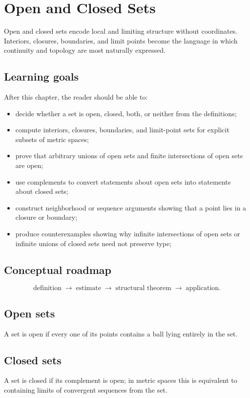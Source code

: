\chapter{Open and Closed Sets}
\label{ch:ii04}

Open and closed sets encode local and limiting structure without coordinates. Interiors, closures, boundaries, and limit points become the language in which continuity and topology are most naturally expressed.

\section*{Learning goals}
After this chapter, the reader should be able to:
\begin{itemize}
\item decide whether a set is open, closed, both, or neither from the definitions;
\item compute interiors, closures, boundaries, and limit-point sets for explicit subsets of metric spaces;
\item prove that arbitrary unions of open sets and finite intersections of open sets are open;
\item use complements to convert statements about open sets into statements about closed sets;
\item construct neighborhood or sequence arguments showing that a point lies in a closure or boundary;
\item produce counterexamples showing why infinite intersections of open sets or infinite unions of closed sets need not preserve type;
\end{itemize}
\section*{Conceptual roadmap}
\[
\boxed{\text{definition}\;\longrightarrow\;\text{estimate}\;\longrightarrow\;\text{structural theorem}\;\longrightarrow\;\text{application}.}
\]

\section{Open sets}
A set is open if every one of its points contains a ball lying entirely in the set.

\section{Closed sets}
A set is closed if its complement is open; in metric spaces this is equivalent to containing limits of convergent sequences from the set.


